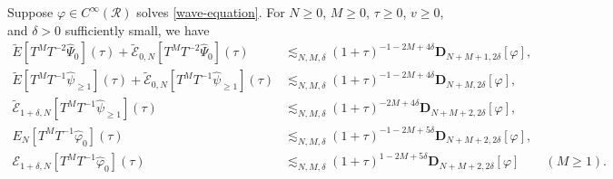 \documentclass[10pt, reqno]{amsart}
\begin{document}
\begin{proposition}
Suppose \(\varphi{}\in C^\infty(\mathcal{R})\) solves \cref{wave-equation}. For \(N\ge 0\), \(M\ge
0\), \(\tau{}\ge 0\), \(v\ge 0\), and \(\delta{} > 0\) sufficiently small, we have
\begin{align}
\tilde{E}[T^MT^{-2}\widehat{\Psi{}}_0](\tau{}) + \tilde{\mathcal{E}}_{0,N}[T^MT^{-2}\widehat{\Psi{}}_0](\tau{})&\lesssim_{N,M,\delta{}} (1+\tau{})^{-1-2M+4\delta{}}\mathbf{D}_{N+M+1,2\delta{}}[\varphi{}], \label{red-Psi}\\
\tilde{E}[T^MT^{-1}\widehat{\psi{}}_{\ge 1}](\tau{}) + \tilde{\mathcal{E}}_{0,N}[T^MT^{-1}\widehat{\psi{}}_{\ge 1}](\tau{}) &\lesssim_{N,M,\delta{}} (1+\tau{})^{-1-2M+4\delta{}}\mathbf{D}_{N+M,2\delta{}}[\varphi{}],\label{red-tilE}\\
\tilde{\mathcal{E}}_{1+\delta{},N}[T^MT^{-1}\widehat{\psi{}}_{\ge 1}](\tau{}) &\lesssim_{N,M,\delta{}} (1+\tau{})^{-2M+4\delta{}}\mathbf{D}_{N+M+2,2\delta{}}[\varphi{}], \label{red-tilcalE} \\
E_N[T^MT^{-1}\widehat{\varphi{}}_0](\tau{}) &\lesssim_{N,M,\delta{}} (1+\tau{})^{-1-2M+5\delta{}}\mathbf{D}_{N+M+2,2\delta{}}[\varphi{}], \label{red-energy}\\
\mathcal{E}_{1+\delta{},N}[T^MT^{-1}\widehat{\varphi{}}_0](\tau{}) &\lesssim_{N,M,\delta{}} (1+\tau{})^{1-2M+5\delta{}}\mathbf{D}_{N+M+2,2\delta{}}[\varphi{}]\qquad (M\ge 1). \label{red-calE}
\end{align}
\label{renormalized-energy-decay}
\end{proposition}
\end{document}
